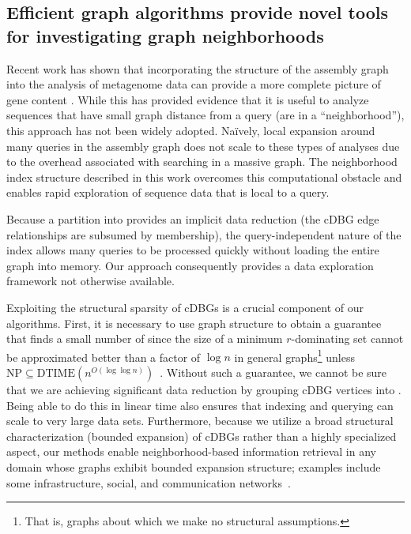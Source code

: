 \subsection*{Efficient graph algorithms provide novel tools for investigating graph neighborhoods}

Recent work has shown that incorporating the structure of the assembly graph into the analysis of metagenome
data can provide a more complete picture of gene content \cite{perchlorate,metacherchant}. While this has provided evidence that it is
useful to analyze sequences that have small graph distance from a query (are in a ``neighborhood''), this approach
has not been widely adopted.
Na\"ively, local expansion around many queries in the assembly graph does not scale to these types of analyses
due to the overhead associated with searching
in a massive graph. The neighborhood index structure described in this work overcomes this computational
obstacle and enables rapid exploration of sequence data that is local to a query.

Because a partition into \pieces provides an implicit data reduction (the cDBG edge relationships are subsumed by \piece membership), the query-independent nature of the index allows many queries to be processed quickly without loading the entire graph into memory.
Our approach consequently provides a data exploration framework not otherwise available.

Exploiting the structural sparsity of cDBGs is a crucial component of our
algorithms. First, it is necessary to use graph structure to obtain a guarantee
that  finds a small number of \pieces since the size
of a minimum $r$-dominating set cannot be approximated better than a factor of
$\log n$ in general graphs\footnote{That is, graphs about which we make no
structural assumptions.} unless $\text{NP}\subseteq \text{DTIME}(n^{O(\log \log
n)})$~\cite{chlebik2008approximation}. Without such a guarantee, we cannot be
sure that we are achieving significant data reduction by grouping cDBG vertices
into \pieces. Being able to do this in linear time also ensures that
indexing and querying can scale to very large data sets. Furthermore, because we
utilize a broad structural characterization (bounded expansion) of cDBGs rather than a
highly specialized aspect, our methods enable neighborhood-based
information retrieval in any domain whose graphs exhibit bounded expansion
structure; examples include some infrastructure,
social, and communication networks~\cite{demaine2014structural,felixThesis,wcol2018}.


